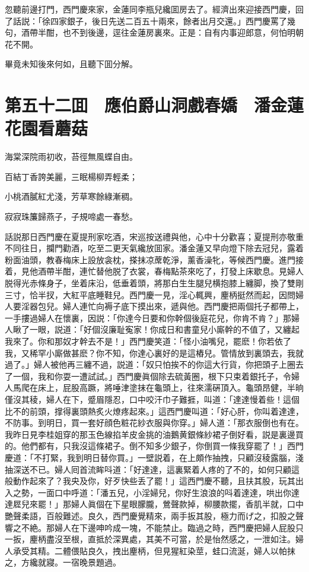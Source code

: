 忽聽前邊打門，西門慶來家，金蓮同李瓶兒纔囬房去了。經濟出來迎接西門慶，回了話説：「徐四家銀子，後日先送二百五十兩來，餘者出月交還。」西門慶罵了幾句，酒帶半酣，也不到後邊，逕往金蓮房裏來。正是：自有内事迎郎意，何怕明朝花不開。

畢竟未知後來何如，且聽下囬分解。

\chapter*{第五十二囬　應伯爵山洞戲春嬌　潘金蓮花園看蘑菇}

海棠深院雨初收，苔徑無風蝶自由。

百結丁香誇美麗，三眠楊柳弄輕柔；

小桃酒膩紅尤淺，芳草寒餘綠漸稠。

寂寂珠簾歸燕子，子規啼處一春愁。

話説那日西門慶在夏提刑家吃酒，宋巡按送禮與他，心中十分歡喜；夏提刑亦敬重不同往日，攔門勸酒，吃至二更天氣纔放囬家。潘金蓮又早向燈下除去冠兒，露着粉面油頭，教春梅床上設放衾枕，搽抹凉蓆乾淨，薰香澡牝，等候西門慶。進門接着，見他酒帶半酣，連忙替他脱了衣裳，春梅點茶來吃了，打發上床歇息。見婦人脱得光赤條身子，坐着床沿，低垂着頭，將那白生生腿兒横抱膝上纏脚，換了雙剛三寸，恰半扠，大紅平底睡鞋兒。西門慶一見，淫心輒興，麈柄挺然而起，因問婦人要淫器包兒。婦人連忙向褥子底下摸出來，遞與他。西門慶把兩個托子都帶上，一手摟過婦人在懷裏，因説：「你達今日要和你幹個後庭花兒，你肯不肯？」那婦人瞅了一眼，説道：「好個沒廉耻寃家！你成日和書童兒小廝幹的不值了，又纏起我來了。你和那奴才幹去不是！」西門慶笑道：「怪小油嘴兒，罷麽！你若依了我，又稀罕小廝做甚麽？你不知，你達心裏好的是這樁兒。管情放到裏頭去，我就過了。」婦人被他再三纏不過，説道：「奴只怕挨不的你這大行貨，你把頭子上圈去了一個，我和你耍一遭試試。」西門慶眞個除去硫黃圈，根下只束着銀托子，令婦人馬爬在床上，屁股高蹶，將唾津塗抹在龜頭上，往來濡硏頂入。龜頭昂健，半晌僅沒其稜，婦人在下，蹙眉隱忍，口中咬汗巾子難捱，叫道：「達達慢着些！這個比不的前頭，撑得裏頭熱炙火燎疼起來。」這西門慶叫道：「好心肝，你叫着達達，不防事。到明日，買一套好顔色粧花紗衣服與你穿。」婦人道：「那衣服倒也有在。我昨日見李桂姐穿的那玉色線掐羊皮金挑的油鵝黄銀條紗裙子倒好看，説是裏邊買的。他們都有，只我沒這條裙子。倒不知多少銀子，你倒買一條我穿罷了！」西門慶道：「不打緊，我到明日替你買。」一壁説着，在上頗作抽拽，只顧沒稜露腦，淺抽深送不已。婦人囘首流眸呌道：「好達達，這裏緊着人疼的了不的，如何只顧這般動作起來了？我央及你，好歹快些丢了罷！」這西門慶不聽，且扶其股，玩其出入之勢，一面口中呼道：「潘五兒，小淫婦兒，你好生浪浪的呌着達達，哄出你達達㞞兒來罷！」那婦人眞個在下星眼朦朧，鶯聲款掉，柳腰款擺，香肌半就，口中艷聲柔語，百般難述。良久，西門慶覺精來，兩手扳其股，極力而げ之，扣股之聲響之不絶。那婦人在下邊呻吟成一塊，不能禁止。臨過之時，西門慶把婦人屁股只一扳，麈柄盡沒至根，直抵於深異處，其美不可當，於是怡然感之，一泄如注。婦人承受其精。二體偎貼良久，拽出麈柄，但見猩紅染莖，蛙口流涎，婦人以帕抹之，方纔就寢。一宿晚景題過。

